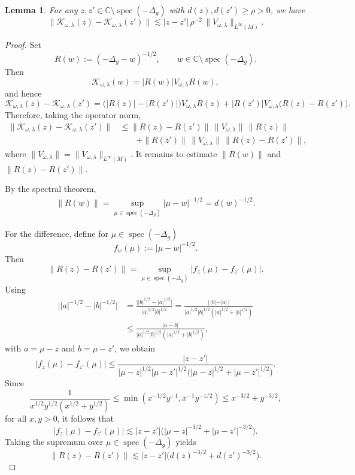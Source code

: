 \documentclass[12pt,reqno]{amsart}
\newtheorem{lemma}[theorem]{Lemma}
\theoremstyle{definition}
\theoremstyle{remark}
\numberwithin{equation}{section}
\newcommand{\1}{\mathbbm{1}}
\newcommand{\C}{\mathbb{C}}
\DeclareMathOperator{\spec}{spec}
\begin{document}
\begin{lemma}\label{lem:BS-perturb-z}
  For any \(z,z'\in \C\setminus \spec(-\Delta_g)\) with $d(z),d(z')\geq  \rho>0$, we have
  \[
    \|\mathcal{K}_{\omega,\lambda}(z)-\mathcal{K}_{\omega,\lambda}(z')\|
    \lesssim |z-z'| \, \rho^{-2}\, \|V_{\omega,\lambda}\|_{L^{\infty}(M)}.
  \]
\end{lemma}

\begin{proof}
  Set
\[
R(w):=(-\Delta_g-w)^{-1/2},
\qquad
w\in \C\setminus \spec(-\Delta_g).
\]
Then
\[
\mathcal{K}_{\omega,\lambda}(w)=|R(w)|V_{\omega,\lambda}R(w),
\]
and hence
\[
\mathcal{K}_{\omega,\lambda}(z)-\mathcal{K}_{\omega,\lambda}(z')
=
\bigl(|R(z)|-|R(z')|\bigr)V_{\omega,\lambda}R(z)
+
|R(z')|V_{\omega,\lambda}\bigl(R(z)-R(z')\bigr).
\]
Therefore, taking the operator norm,
\begin{align*}
\|\mathcal{K}_{\omega,\lambda}(z)-\mathcal{K}_{\omega,\lambda}(z')\|
&\leq
\|R(z)-R(z')\|\,\|V_{\omega,\lambda}\|\,\|R(z)\| \\
&\qquad
+\|R(z')\|\,\|V_{\omega,\lambda}\|\,\|R(z)-R(z')\|,
\end{align*}
where $\|V_{\omega,\lambda}\|=\|V_{\omega,\lambda}\|_{L^{\infty}(M)}$.
It remains to estimate \(\|R(w)\|\) and \(\|R(z)-R(z')\|\).

By the spectral theorem,
\begin{align}\label{eq:trivial bound R(w)}
\|R(w)\|
=
\sup_{\mu\in \spec(-\Delta_g)} |\mu-w|^{-1/2}
=
d(w)^{-1/2}.
\end{align}

For the difference, define for \(\mu\in \spec(-\Delta_g)\)
\[
f_w(\mu):=|\mu-w|^{-1/2}.
\]
Then
\[
\|R(z)-R(z')\|
=
\sup_{\mu\in \spec(-\Delta_g)} |f_z(\mu)-f_{z'}(\mu)|.
\]
Using 
\begin{align*}
\bigl||a|^{-1/2}-|b|^{-1/2}\bigr|
&=
\frac{\bigl||b|^{1/2}-|a|^{1/2}\bigr|}{|a|^{1/2}|b|^{1/2}}
=
\frac{|\,|b|-|a|\,|}{|a|^{1/2}|b|^{1/2}(|a|^{1/2}+|b|^{1/2})}\\
&\leq
\frac{|a-b|}{|a|^{1/2}|b|^{1/2}(|a|^{1/2}+|b|^{1/2})},
\end{align*}
with \(a=\mu-z\) and \(b=\mu-z'\), we obtain
\[
|f_z(\mu)-f_{z'}(\mu)|
\leq
\frac{|z-z'|}{|\mu-z|^{1/2}|\mu-z'|^{1/2}
\bigl(|\mu-z|^{1/2}+|\mu-z'|^{1/2}\bigr)}.
\]
Since
\[
\frac{1}{x^{1/2}y^{1/2}(x^{1/2}+y^{1/2})}
\leq
\min(x^{-1/2}y^{-1},x^{-1}y^{-1/2})
\leq
x^{-3/2}+y^{-3/2},
\]
for all \(x,y>0\), it follows that
\[
|f_z(\mu)-f_{z'}(\mu)|
\lesssim
|z-z'|\bigl(|\mu-z|^{-3/2}+|\mu-z'|^{-3/2}\bigr).
\]
Taking the supremum over \(\mu\in \spec(-\Delta_g)\) yields
\[
\|R(z)-R(z')\|
\lesssim
|z-z'|\bigl(d(z)^{-3/2}+d(z')^{-3/2}\bigr).
\]


\end{proof}
\end{document}
